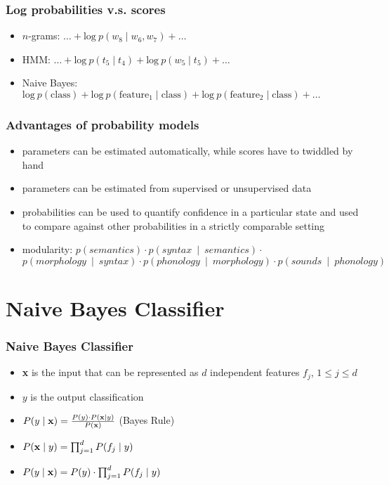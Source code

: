 \begin{frame}
\frametitle{Log probabilities v.s. scores}
\begin{itemize}[<+->]
\item $n$-grams: $\ldots + \textrm{log}\ p(w_8 \mid w_6, w_7) + \ldots$
\item HMM: $\ldots + \textrm{log}\ p(t_5 \mid t_4) + \textrm{log}\ p(w_5 \mid t_5) + \ldots$
\item Naive Bayes: $\textrm{log}\ p(\textrm{class}) +
  \textrm{log}\ p(\textrm{feature}_1 \mid \textrm{class}) + \textrm{log}\ p(\textrm{feature}_2
  \mid \textrm{class}) + \ldots$
\end{itemize}
\end{frame}

\begin{frame}
\frametitle{Advantages of probability models}
\begin{itemize}[<+->]
\item parameters can be estimated automatically, while scores have to
  twiddled by hand
\item parameters can be estimated from supervised or unsupervised data
\item probabilities can be used to quantify confidence in a particular
  state and used to compare against other probabilities in a strictly
  comparable setting
\item modularity: $p(semantics) \cdot p(syntax~\mid~semantics) \cdot$  \\
$p(morphology~\mid~syntax) \cdot p(phonology~\mid~morphology) \cdot p(sounds~\mid~phonology)$
\end{itemize}
\end{frame}


\section{Naive Bayes Classifier}
\frame{\tableofcontents[currentsection]}

\begin{frame}
\frametitle{Naive Bayes Classifier}
\begin{itemize}[<+->]
\item \textbf{x} is the input that can be represented as $d$ independent features $f_j$, $1 \leq j \leq d$
\item $y$ is the output classification
\item $P(y \mid {\bf x}) = \frac{P(y) \cdot P({\bf x} \mid y)}{P({\bf x})}$ (Bayes Rule)
\item $P({\bf x} \mid y) = \prod_{j=1}^{d} P(f_j  \mid y)$
\item $P(y \mid {\bf x}) = P(y) \cdot  \prod_{j=1}^{d} P(f_j  \mid y)$
\end{itemize}
\end{frame}


